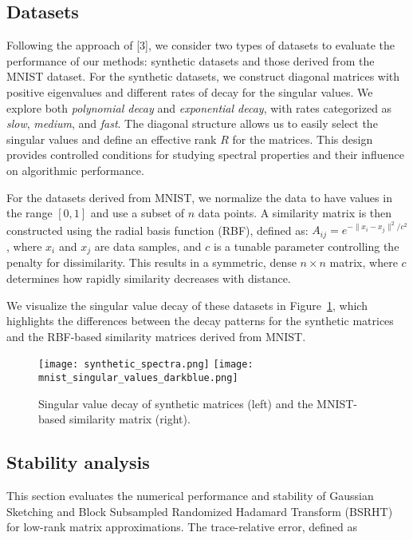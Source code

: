 \documentclass[a4paper, 12pt,oneside]{article}
\begin{document}
		\subsection{Datasets}
		Following the approach of [3], we consider two types of datasets to evaluate the performance of our methods: synthetic datasets and those derived from the MNIST dataset. For the synthetic datasets, we construct diagonal matrices with positive eigenvalues and different rates of decay for the singular values. We explore both \textit{polynomial decay} and \textit{exponential decay}, with rates categorized as \textit{slow}, \textit{medium}, and \textit{fast}. The diagonal structure allows us to easily select the singular values and define an effective rank \( R \) for the matrices. This design provides controlled conditions for studying spectral properties and their influence on algorithmic performance.

	For the datasets derived from MNIST, we normalize the data to have values in the range \([0, 1]\) and use a subset of \( n \) data points. A similarity matrix is then constructed using the radial basis function (RBF), defined as:
	$A_{ij} = e^{-\|x_i - x_j\|^2 / c^2}$, where \( x_i \) and \( x_j \) are data samples, and \( c \) is a tunable parameter controlling the penalty for dissimilarity. This results in a symmetric, dense \( n \times n \) matrix, where \( c \) determines how rapidly similarity decreases with distance. 

	We visualize the singular value decay of these datasets in Figure~\ref{fig:singular_value_comparison}, which highlights the differences between the decay patterns for the synthetic matrices and the RBF-based similarity matrices derived from MNIST.
	\begin{figure}[H]
		\centering
		\texttt{[image: synthetic\_spectra.png]}
		\hspace{0.02\textwidth} %
		\texttt{[image: mnist\_singular\_values\_darkblue.png]}
		\caption{Singular value decay of synthetic matrices (left) and the MNIST-based similarity matrix (right).}
		\label{fig:singular_value_comparison}
	\end{figure}
	\subsection{Stability analysis}
	This section evaluates the numerical performance and stability of Gaussian Sketching and Block Subsampled Randomized Hadamard Transform (BSRHT) for low-rank matrix approximations. The trace-relative error, defined as 
\end{document}
